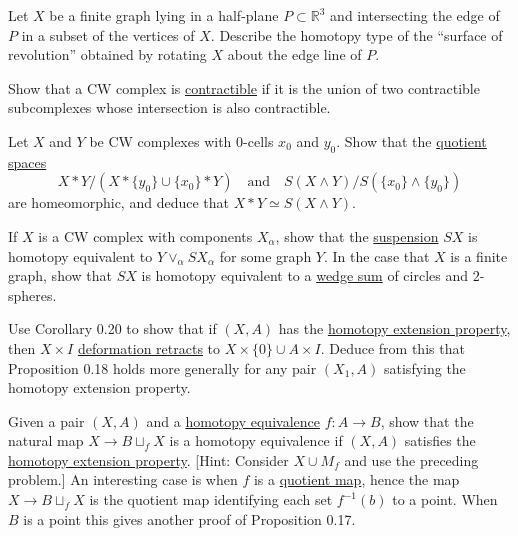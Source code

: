 	\begin{exercise}[Hatcher 0.22]
		Let $X$ be a finite graph lying in a half-plane $P \subset \mathbb{R}^3$ and intersecting the edge of $P$ in a subset of the vertices of $X$. Describe the homotopy type of the ``surface of revolution'' obtained by rotating $X$ about the edge line of $P$.
	\end{exercise}

	\begin{exercise}[Hatcher 0.23]
		Show that a CW complex is \hyperref[def:contractible]{contractible} if it is the union of two contractible subcomplexes whose intersection is also contractible.
	\end{exercise}

	\begin{exercise}[Hatcher 0.24]
		Let $X$ and $Y$ be CW complexes with $0$-cells $x_0$ and $y_0$. Show that the \hyperref[pst-thm:quotient-spaces]{quotient spaces}
		\begin{equation}
			X * Y / (X * \{y_0\} \cup \{x_0\} * Y)
			\quad \text{and} \quad
			S(X \wedge Y) / S(\{x_0\} \wedge \{y_0\})
		\end{equation}
		are homeomorphic, and deduce that $X * Y \simeq S(X \wedge Y)$.
	\end{exercise}

	\begin{exercise}[Hatcher 0.25]
		If $X$ is a CW complex with components $X_\alpha$, show that the \hyperref[pst-def:suspension]{suspension} $SX$ is homotopy equivalent to $Y \vee_\alpha SX_\alpha$ for some graph $Y$. In the case that $X$ is a finite graph, show that $SX$ is homotopy equivalent to a \hyperref[pst-def:wedge-sum]{wedge sum} of circles and $2$-spheres.
	\end{exercise}

	\begin{exercise}[Hatcher 0.26]
		Use Corollary 0.20 to show that if $(X,A)$ has the \hyperref[def:homotopy-extension-property]{homotopy extension property}, then $X \times I$ \hyperref[def:deformation-retract]{deformation retracts} to $X \times \{0\} \cup A \times I$. Deduce from this that Proposition 0.18 holds more generally for any pair $(X_1,A)$ satisfying the homotopy extension property.
	\end{exercise}

	\begin{exercise}[Hatcher 0.27]
		Given a pair $(X,A)$ and a \hyperref[def:homotopy-equivalence]{homotopy equivalence} $f: A \to B$, show that the natural map $X \to B \sqcup_f X$ is a homotopy equivalence if $(X,A)$ satisfies the \hyperref[def:homotopy-extension-property]{homotopy extension property}. [Hint: Consider $X \cup M_f$ and use the preceding problem.] An interesting case is when $f$ is a \hyperref[pst-def:quotient-map]{quotient map}, hence the map $X \to B \sqcup_f X$ is the quotient map identifying each set $f^{-1}(b)$ to a point. When $B$ is a point this gives another proof of Proposition 0.17.
	\end{exercise}

